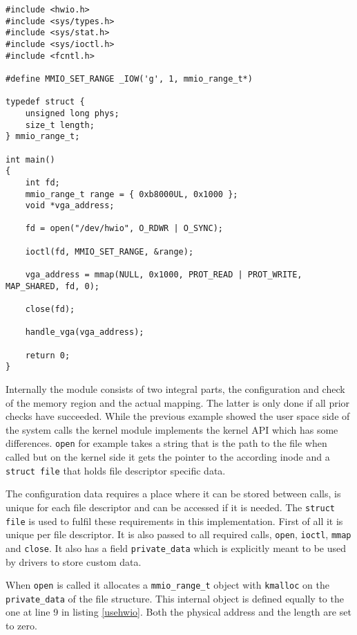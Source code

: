 \documentclass[
a4paper,
12pt,
notitlepage,
parskip=half,
DIV=11,
]{scrbook}
\begin{document}
		\begin{lstlisting}[basicstyle=\ttfamily\footnotesize]
#include <hwio.h>
#include <sys/types.h>
#include <sys/stat.h>
#include <sys/ioctl.h>
#include <fcntl.h>

#define MMIO_SET_RANGE _IOW('g', 1, mmio_range_t*)

typedef struct {
	unsigned long phys;
	size_t length;
} mmio_range_t;

int main()
{
	int fd;
	mmio_range_t range = { 0xb8000UL, 0x1000 };
	void *vga_address;
	
	fd = open("/dev/hwio", O_RDWR | O_SYNC);
	
	ioctl(fd, MMIO_SET_RANGE, &range);
	
	vga_address = mmap(NULL, 0x1000, PROT_READ | PROT_WRITE, MAP_SHARED, fd, 0);
	
	close(fd);
	
	handle_vga(vga_address);
	
	return 0;
}
		\end{lstlisting}
		
		Internally the module consists of two integral parts, the configuration and check of the memory region and the actual mapping.
		The latter is only done if all prior checks have succeeded.
		While the previous example showed the user space side of the system calls the kernel module implements the kernel API which has some differences.
		\texttt{open} for example takes a string that is the path to the file when called but on the kernel side it gets the pointer to the according inode and a \texttt{struct file} that holds file descriptor specific data.
		
		The configuration data requires a place where it can be stored between calls, is unique for each file descriptor and can be accessed if it is needed.
		The \texttt{struct file} is used to fulfil these requirements in this implementation.
		First of all it is unique per file descriptor.
		It is also passed to all required calls, \texttt{open}, \texttt{ioctl}, \texttt{mmap} and \texttt{close}.
		It also has a field \texttt{private\_data} which is explicitly meant to be used by drivers to store custom data.
		
		When \texttt{open} is called it allocates a \texttt{mmio\_range\_t} object with \texttt{kmalloc} on the \texttt{private\_data} of the file structure.
		This internal object is defined equally to the one at line 9 in listing \ref{usehwio}.
		Both the physical address and the length are set to zero.
		
\end{document}
